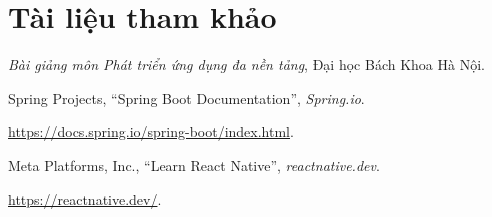 \section*{Tài liệu tham khảo}

\begin{enumerate}[label={[\arabic*]}] %
    \item \textit{Bài giảng môn Phát triển ứng dụng đa nền tảng}, Đại học Bách Khoa Hà Nội.

    \item Spring Projects, ``Spring Boot Documentation'', \textit{Spring.io}. 
    
    \url{https://docs.spring.io/spring-boot/index.html}.

    \item Meta Platforms, Inc., ``Learn React Native'', \textit{reactnative.dev}. 
    
    \url{https://reactnative.dev/}.
\end{enumerate}